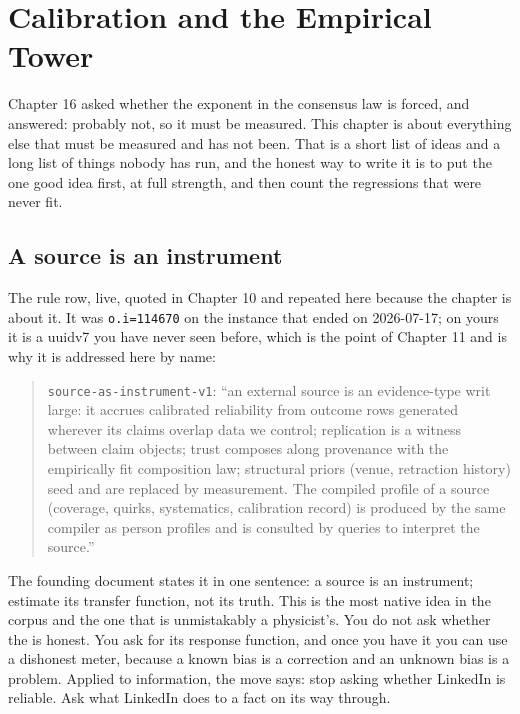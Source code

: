 \chapter{Calibration and the Empirical Tower}\label{ch:calibration}

Chapter 16 asked whether the exponent in the consensus law is forced, and answered: probably not, so it must be measured. This chapter is about everything else that must be measured and has not been. That is a short list of ideas and a long list of things nobody has run, and the honest way to write it is to put the one good idea first, at full strength, and then count the regressions that were never fit.

\section{A source is an instrument}

The rule row, live, quoted in Chapter 10 and repeated here because the chapter is about it. It was \texttt{o.i=114670} on the instance that ended on 2026-07-17; on yours it is a uuidv7 you have never seen before, which is the point of Chapter 11 and is why it is addressed here by name:

\begin{quote}
\small\texttt{source-as-instrument-v1}: ``an external source is an evidence-type writ large: it accrues calibrated reliability from outcome rows generated wherever its claims overlap data we control; replication is a witness between claim objects; trust composes along provenance with the empirically fit composition law; structural priors (venue, retraction history) seed and are replaced by measurement. The compiled profile of a source (coverage, quirks, systematics, calibration record) is produced by the same compiler as person profiles and is consulted by queries to interpret the source.''
\end{quote}

The founding document states it in one sentence: a source is an instrument; estimate its transfer function, not its truth. This is the most native idea in the corpus and the one that is unmistakably a physicist's. You do not ask whether the \labLockin{} is honest. You ask for its response function, and once you have it you can use a dishonest meter, because a known bias is a correction and an unknown bias is a problem. Applied to information, the move says: stop asking whether LinkedIn is reliable. Ask what LinkedIn does to a fact on its way through.

